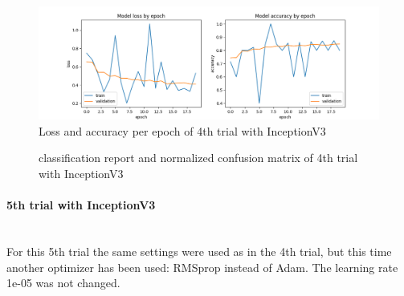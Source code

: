 \documentclass{article}
\begin{document}
\begin{figure}%
    \centering
    \includegraphics[width=1.0\linewidth]{inceptionv3_07_loss_accuracy.png}
    \caption{Loss and accuracy per epoch of 4th trial with InceptionV3}
    \label{fig:inceptionv3_07_loss_accuracy}
\end{figure}

\begin{figure}%
  \centering
  \qquad
  \caption{classification report and normalized confusion matrix of 4th trial with InceptionV3}
  \label{fig:inceptionv3_07_results}
\end{figure}

\paragraph{5th trial with InceptionV3}\mbox{}\\


For this 5th trial the same settings were used as in the 4th trial, but this time another optimizer has been used: RMSprop instead of Adam. The learning rate 1e-05 was not changed. 
\end{document}
